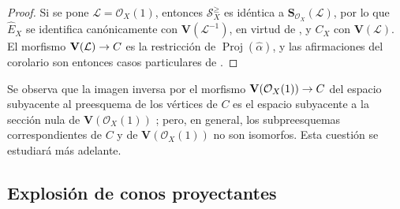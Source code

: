 \documentclass[oneside,10pt]{amsart}
\makeatletter
\renewcommand{\geq}{\geqslant}
\newcommand{\ega@arrow}[2]{\mathchoice{#1}{#2}{#2}{#2}}
\renewcommand{\to}{\ega@arrow{\longrightarrow}{\rightarrow}}
\let\EGAOriginalLabel\label
\renewcommand{\label}[1]{\phantomsection\EGAOriginalLabel{#1}}
\makeatother
\begin{document}
\begin{proof}
Si se pone $\mathcal{L}=\mathcal{O}_X(1)$, entonces $\mathcal{S}_X^{\geq}$ es idéntica a $\mathbf{S}_{\mathcal{O}_X}(\mathcal{L})$, por lo que $\widehat{E}_X$ se identifica canónicamente con $\mathbf{V}(\mathcal{L}^{-1})$, en virtud de , y $C_X$ con $\mathbf{V}(\mathcal{L})$.
El morfismo $\mathbf{V}(\mathcal{L})\to C$ es la restricción de $\operatorname{Proj}(\widehat{\alpha})$, y las afirmaciones del corolario son entonces casos particulares de .
\end{proof}

Se observa que la imagen inversa por el morfismo $\mathbf{V}(\mathcal{O}_X(1))\to C$ del espacio subyacente al preesquema de los vértices de $C$ es el espacio subyacente a la sección nula de $\mathbf{V}(\mathcal{O}_X(1))$ ;
pero, en general, los subpreesquemas correspondientes de $C$ y de $\mathbf{V}(\mathcal{O}_X(1))$ no son isomorfos.
Esta cuestión se estudiará más adelante.
\subsection{Explosión de conos proyectantes}
\label{subsection:II.8.7-fr}
\end{document}
